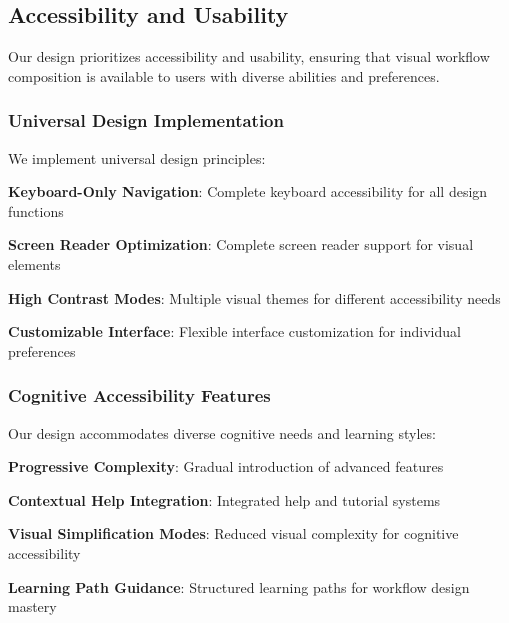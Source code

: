 \subsection*{Accessibility and Usability}

Our design prioritizes accessibility and usability, ensuring that visual workflow composition is available to users with diverse abilities and preferences.

\subsubsection*{Universal Design Implementation}

We implement universal design principles:

\begin{compactlist}
    \item \textbf{Keyboard-Only Navigation}: Complete keyboard accessibility for all design functions
    \item \textbf{Screen Reader Optimization}: Complete screen reader support for visual elements
    \item \textbf{High Contrast Modes}: Multiple visual themes for different accessibility needs
    \item \textbf{Customizable Interface}: Flexible interface customization for individual preferences
\end{compactlist}

\subsubsection*{Cognitive Accessibility Features}

Our design accommodates diverse cognitive needs and learning styles:

\begin{compactlist}
    \item \textbf{Progressive Complexity}: Gradual introduction of advanced features
    \item \textbf{Contextual Help Integration}: Integrated help and tutorial systems
    \item \textbf{Visual Simplification Modes}: Reduced visual complexity for cognitive accessibility
    \item \textbf{Learning Path Guidance}: Structured learning paths for workflow design mastery
\end{compactlist}

